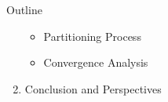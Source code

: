 \documentclass[compress,10pt,aspectratio=169]{beamer}
\begin{document}
\begin{frame}{Outline}
\begin{enumerate}
        \vspace{0.26cm}
        \begin{itemize}
            \item Partitioning Process\\\vspace{0.18cm}
            \item Convergence Analysis\\\vspace{0.18cm}
        \end{itemize}
        \item Conclusion and Perspectives
    \end{enumerate}
\end{frame}
\end{document}
